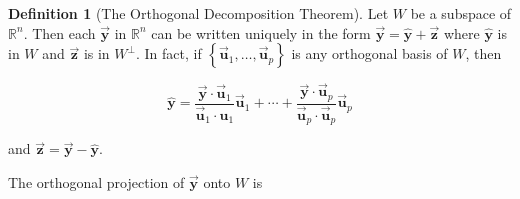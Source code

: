 \documentclass[letter,11pt]{article}
\theoremstyle{definition}
\newtheorem{definition}{Definition}[section]
\begin{document}
\begin{tcolorbox}[boxrule=1mm,enhanced jigsaw, breakable,before=\hfill,after=\hfill,adjusted title={Problem 2 solution}]
    \begin{definition}[The Orthogonal Decomposition Theorem]
        Let $W$ be a subspace of $\mathbb{R}^n$. Then each $\vec{\boldsymbol{y}}$ in $\mathbb{R}^n$ can be written uniquely in the form  $\vec{\boldsymbol{y}}=\hat{\boldsymbol{y}}+\vec{\boldsymbol{z}}$ where $\hat{\boldsymbol{y}}$ is in $W$ and $\vec{\boldsymbol{z}}$ is in $W^{\perp}$. In fact, if $\left\{\vec{\boldsymbol{u}}_1, \ldots, \vec{\boldsymbol{u}}_p\right\}$ is any orthogonal basis of $W$, then
        
    $$\hat{\boldsymbol{y}}=\frac{\vec{\boldsymbol{y}} \cdot \vec{\boldsymbol{u}}_1}{\vec{\boldsymbol{u}}_1 \cdot \boldsymbol{u}_1} \vec{\boldsymbol{u}}_1+\cdots+\frac{\vec{\boldsymbol{y}} \cdot \vec{\boldsymbol{u}}_p}{\vec{\boldsymbol{u}}_p \cdot \vec{\boldsymbol{u}}_p} \vec{\boldsymbol{u}}_p$$

    and $\vec{\boldsymbol{z}}=\vec{\boldsymbol{y}}-\hat{\boldsymbol{y}}$.
    \end{definition}
    \tcblower
    The orthogonal projection of $\vec{\boldsymbol{y}}$ onto $W$ is


\end{tcolorbox}
\end{document}
